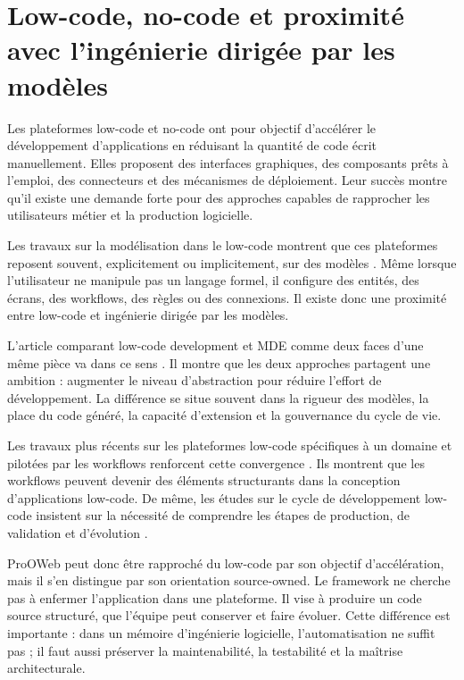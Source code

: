 \documentclass[12pt,a4paper]{article}
\begin{document}
\section{Low-code, no-code et proximité avec l'ingénierie dirigée par les modèles}

Les plateformes low-code et no-code ont pour objectif d'accélérer le développement d'applications en réduisant la quantité de code écrit manuellement. Elles proposent des interfaces graphiques, des composants prêts à l'emploi, des connecteurs et des mécanismes de déploiement. Leur succès montre qu'il existe une demande forte pour des approches capables de rapprocher les utilisateurs métier et la production logicielle.

Les travaux sur la modélisation dans le low-code montrent que ces plateformes reposent souvent, explicitement ou implicitement, sur des modèles \cite{lowcodereview2022}. Même lorsque l'utilisateur ne manipule pas un langage formel, il configure des entités, des écrans, des workflows, des règles ou des connexions. Il existe donc une proximité entre low-code et ingénierie dirigée par les modèles.

L'article comparant low-code development et MDE comme deux faces d'une même pièce va dans ce sens \cite{lowcodemde2022}. Il montre que les deux approches partagent une ambition : augmenter le niveau d'abstraction pour réduire l'effort de développement. La différence se situe souvent dans la rigueur des modèles, la place du code généré, la capacité d'extension et la gouvernance du cycle de vie.

Les travaux plus récents sur les plateformes low-code spécifiques à un domaine et pilotées par les workflows renforcent cette convergence \cite{lowcodeworkflow2026}. Ils montrent que les workflows peuvent devenir des éléments structurants dans la conception d'applications low-code. De même, les études sur le cycle de développement low-code insistent sur la nécessité de comprendre les étapes de production, de validation et d'évolution \cite{pankowska2024}.

ProOWeb peut donc être rapproché du low-code par son objectif d'accélération, mais il s'en distingue par son orientation source-owned. Le framework ne cherche pas à enfermer l'application dans une plateforme. Il vise à produire un code source structuré, que l'équipe peut conserver et faire évoluer. Cette différence est importante : dans un mémoire d'ingénierie logicielle, l'automatisation ne suffit pas ; il faut aussi préserver la maintenabilité, la testabilité et la maîtrise architecturale.
\end{document}
